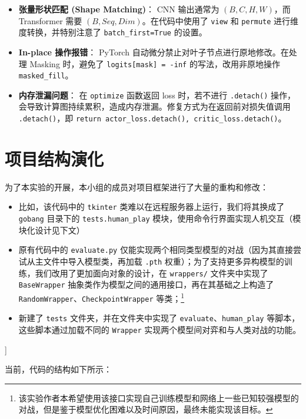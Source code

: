 \documentclass[oneside]{ctexbook}
\begin{document}
\begin{itemize}
    \item \textbf{张量形状匹配 (Shape Matching)}：
    CNN 输出通常为 $(B, C, H, W)$，而 Transformer 需要 $(B, Seq, Dim)$。在代码中使用了 \texttt{view} 和 \texttt{permute} 进行维度转换，并特别注意了 \texttt{batch\_first=True} 的设置。
    
    \item \textbf{In-place 操作报错}：
    PyTorch 自动微分禁止对叶子节点进行原地修改。在处理 Masking 时，避免了 \texttt{logits[mask] = -inf} 的写法，改用非原地操作 \texttt{masked\_fill}。
    
    \item \textbf{内存泄漏问题}：
    在 \texttt{optimize} 函数返回 loss 时，若不进行 \texttt{.detach()} 操作，会导致计算图持续累积，造成内存泄漏。修复方式为在返回前对损失值调用 \texttt{.detach()}，即 \texttt{return actor\_loss.detach(), critic\_loss.detach()}。
\end{itemize}

\section{项目结构演化} \label{sec:project-structure}

为了本实验的开展，本小组的成员对项目框架进行了大量的重构和修改：

\begin{itemize}
    \item 比如，该代码中的 \verb|tkinter| 类难以在远程服务器上运行，我们将其换成了 \verb|gobang| 目录下的 \verb|tests.human_play| 模块，使用命令行界面实现人机交互（模块化设计见下文）
    \item 原有代码中的 \verb|evaluate.py| 仅能实现两个相同类型模型的对战（因为其直接尝试从主文件中导入模型类，再加载 \verb|.pth| 权重）；为了支持更多异构模型的训练，我们改用了更加面向对象的设计，在 \verb|wrappers/| 文件夹中实现了 \verb|BaseWrapper| 抽象类作为模型之间的通用接口，再在其基础之上构造了 \verb|RandomWrapper|、\verb|CheckpointWrapper| 等类；\footnote{该实验作者本希望使用该接口实现自己训练模型和网络上一些已知较强模型的对战，但是鉴于模型优化困难以及时间原因，最终未能实现该目标。}
    \item 新建了 \verb|tests| 文件夹，并在文件夹中实现了 \verb|evaluate|、\verb|human_play| 等脚本，这些脚本通过加载不同的 \verb|Wrapper| 实现两个模型间对弈和与人类对战的功能。
\end{itemize}]

当前，代码的结构如下所示：
\end{document}
